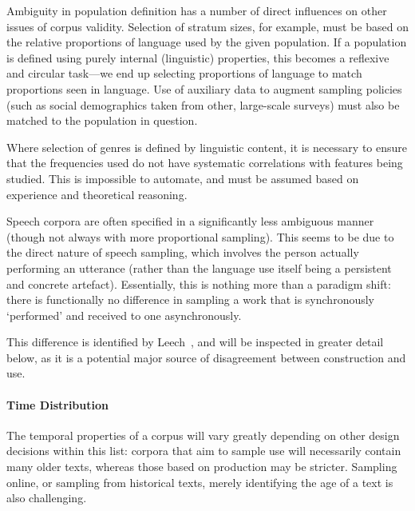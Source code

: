 Ambiguity in population definition has a number of direct influences on other issues of corpus validity. Selection of stratum sizes, for example, must be based on the relative proportions of language used by the given population.  If a population is defined using purely internal (linguistic) properties, this becomes a reflexive and circular task---we end up selecting proportions of language to match proportions seen in language.  Use of auxiliary data to augment sampling policies (such as social demographics taken from other, large-scale surveys) must also be matched to the population in question.

Where selection of genres is defined by linguistic content, it is necessary to ensure that the frequencies used do not have systematic correlations with features being studied.  This is impossible to automate, and must be assumed based on experience and theoretical reasoning.


Speech corpora are often specified in a significantly less ambiguous manner (though not always with more proportional sampling). This seems to be due to the direct nature of speech sampling, which involves the person actually performing an utterance (rather than the language use itself being a persistent and concrete artefact).  Essentially, this is nothing more than a paradigm shift: there is functionally no difference in sampling a work that is synchronously `performed' and received to one asynchronously.

This difference is identified by Leech~\cite{leech2006new}, and will be inspected in greater detail below, as it is a potential major source of disagreement between construction and use. %









\paragraph{Time Distribution}
The temporal properties of a corpus will vary greatly depending on other design decisions within this list: corpora that aim to sample use will necessarily contain many older texts, whereas those based on production may be stricter.
Sampling online, or sampling from historical texts, merely identifying the age of a text is also challenging.

